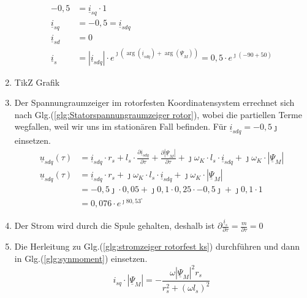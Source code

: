 \begin{solution}
\begin{enumerate}
\begin{align}
-0,5 &= \underline{i}_{sq} \cdot 1\\
\underline{i}_{sq} &= -0,5 = \underline{i}_{sdq} \\
\underline{i}_{sd} &= 0\\
\underline{i}_{s} &= |\underline{i}_{sdq}| \cdot e^{\jmath (\arg(\underline{i}_{sdq}) + \arg(\underline{\Psi}_{M}))}= 0,5 \cdot e^{\jmath ( -90 + 50)}
\end{align}
\item TikZ Grafik
\item Der Spannungraumzeiger im rotorfesten Koordinatensystem errechnet sich nach Glg.(\ref{glg:Statorspannungraumzeiger rotor}), wobei die partiellen Terme wegfallen, weil wir uns im station\"aren Fall befinden. F\"ur $\underline{i}_{sdq}= -0,5 \jmath$ einsetzen.
\begin{align}
\underline{u}_{sdq}(\tau) &= \underline{i}_{sdq} \cdot r_s + l_s \cdot \frac{\partial \underline{i}_{sdq}}{\partial \tau} + \frac{\partial |\underline{\Psi}_M|}{\partial \tau} + \jmath \omega_K \cdot l_s \cdot \underline{i}_{sdq} + \jmath \omega_K \cdot |\underline{\Psi}_M|\\
\underline{u}_{sdq}(\tau) &= \underline{i}_{sdq} \cdot r_s + \jmath \omega_K \cdot l_s \cdot \underline{i}_{sdq} + \jmath \omega_K \cdot |\underline{\Psi}_M|\\
&= -0,5 \jmath \cdot 0,05 + \jmath 0,1 \cdot 0,25 \cdot -0,5 \jmath+\jmath 0,1 \cdot 1\\
&=0,076 \cdot e^{\jmath 80,53^\circ}
\end{align}
\item Der Strom wird durch die Spule gehalten, deshalb ist $\partial \frac{\underline{i}_s}{\partial \tau} = \frac{m}{\partial \tau} = 0$
\item Die Herleitung zu Glg.(\ref{glg:stromzeiger rotorfest ks}) durchf\"uhren und dann in Glg.(\ref{glg:synmoment}) einsetzen.
\begin{equation}
i_{sq} \cdot | \underline{\Psi}_M| = -\frac{\omega |\underline{\Psi}_M|^2 r_s}{r_s^2 + (\omega l_s)^2}
\end{equation}
\end{enumerate}
\end{solution}